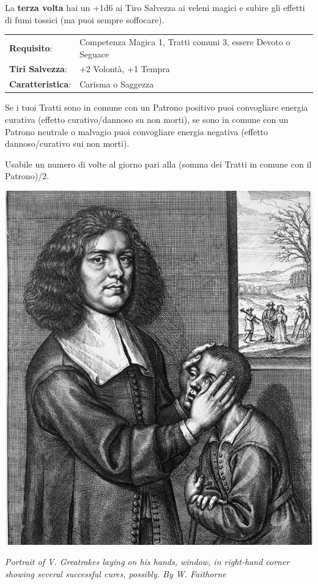 \begin{multicols}{2}
La \textbf{terza volta} hai un +1d6 ai Tiro Salvezza ai veleni magici e subire gli effetti di fumi tossici (ma puoi sempre soffocare).

\noindent\begin{tabularx}{\linewidth}{>{\raggedright\arraybackslash}p{2.5cm}X}
\rowcolor{gray!20}\textbf{Requisito}: & Competenza Magica 1, Tratti comuni 3, essere Devoto o Seguace\\
\textbf{Tiri Salvezza}: & +2 Volontà, +1 Tempra\\
\rowcolor{gray!20}\textbf{Caratteristica}: & Carisma o Saggezza\\
\end{tabularx}\smallskip

Se i tuoi Tratti sono in comune con un Patrono positivo puoi convogliare energia curativa (effetto curativo/dannoso su non morti), se sono in comune con un Patrono neutrale o malvagio puoi convogliare energia negativa (effetto dannoso/curativo sui non morti).

Usabile un numero di volte al giorno pari alla (somma dei Tratti in comune con il Patrono)/2.

\medskip

\begin{center}
	\includegraphics[width=0.75\linewidth]{immagini/Portrait_of_V_Greatrakesv2.png}

	\emph{Portrait of V. Greatrakes laying on his hands, window, in right-hand corner showing several successful cures, possibly. By W. Faithorne }
\end{center}


\end{multicols}
